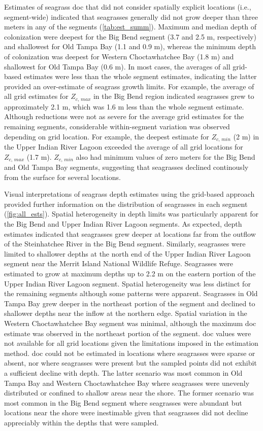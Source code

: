 \documentclass[letterpaper,12pt,oneside]{article}\usepackage[]{graphicx}\usepackage[]{color}
\begin{document}
Estimates of seagrass \ac{doc} that did not consider spatially explicit locations (i.e., segment-wide) indicated that seagrasses generally did not grow deeper than three meters in any of the segments (\cref{tab:est_summ}).  Maximum and median depth of colonization were deepest for the Big Bend segment (3.7 and 2.5 m, respectively) and shallowest for Old Tampa Bay (1.1 and 0.9 m), whereas the minimum depth of colonization was deepest for Western Choctawhatchee Bay (1.8 m) and shallowest for Old Tampa Bay (0.6 m).  In most cases, the averages of all grid-based estimates were less than the whole segment estimates, indicating the latter provided an over-estimate of seagrass growth limits.  For example, the average of all grid estimates for $Z_{c,\,max}$ in the Big Bend region indicated seagrasses grew to approximately 2.1 m, which was 1.6 m less than the whole segment estimate.  Although reductions were not as severe for the average grid estimates for the remaining segments, considerable within-segment variation was observed depending on grid location.  For example, the deepest estimate for $Z_{c,\,min}$ (2 m) in the Upper Indian River Lagoon exceeded the average of all grid locations for $Z_{c,\,max}$ (1.7 m).  $Z_{c,\,min}$ also had minimum values of zero meters for the Big Bend and Old Tampa Bay segments, suggesting that seagrasses declined continously from the surface for several locations.   

Visual interpretations of seagrass depth estimates using the grid-based approach provided further information on the distribution of seagrasses in each segment (\cref{fig:all_ests}).  Spatial heterogeneity in depth limits was particularly apparent for the Big Bend and Upper Indian River Lagoon segments.  As expected, depth estimates indicated that seagrasses grew deeper at locations far from the outflow of the Steinhatchee River in the Big Bend segment.  Similarly, seagrasses were limited to shallower depths at the north end of the Upper Indian River Lagoon segment near the Merrit Island National Wildlife Refuge. Seagrasses were estimated to grow at maximum depths up to 2.2 m on the eastern portion of the Upper Indian River Lagoon segment.  Spatial heterogeneity was less distinct for the remaining segments although some patterns were apparent.  Seagrasses in Old Tampa Bay grew deeper in the northeast portion of the segment and declined to shallower depths near the inflow at the northern edge.  Spatial variation in the Western Choctawhatchee Bay segment was minimal, although the maximum \ac{doc} estimate was observed in the northeast portion of the segment.  \ac{doc} values were not available for all grid locations given the limitations imposed in the estimation method.  \ac{doc} could not be estimated in locations where seagrasses were sparse or absent, nor where seagrasses were present but the sampled points did not exhibit a sufficient decline with depth.  The latter scenario was most common in Old Tampa Bay and Western Choctawhatchee Bay where seagrasses were unevenly distributed or confined to shallow areas near the shore.  The former scenario was most common in the Big Bend segment where seagrasses were abundant but locations near the shore were inestimable given that seagrasses did not decline appreciably within the depths that were sampled.   
\end{document}
